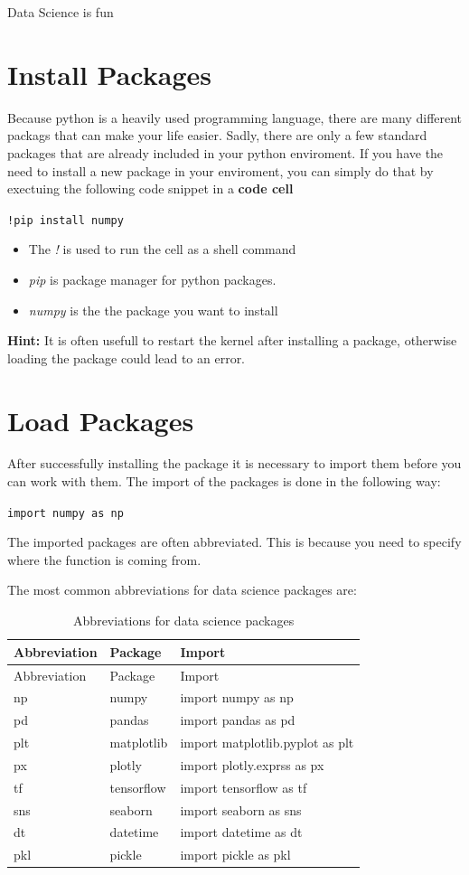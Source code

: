 \documentclass[
  letterpaper,
  DIV=11,
  numbers=noendperiod]{scrreprt}
\begin{document}
Data Science is fun

\section{Install Packages}\label{install-packages}

Because python is a heavily used programming language, there are many
different packags that can make your life easier. Sadly, there are only
a few standard packages that are already included in your python
enviroment. If you have the need to install a new package in your
enviroment, you can simply do that by exectuing the following code
snippet in a \textbf{code cell}

\texttt{!pip\ install\ numpy}

\begin{itemize}
\item
  The \emph{!} is used to run the cell as a shell command
\item
  \emph{pip} is package manager for python packages.
\item
  \emph{numpy} is the the package you want to install
\end{itemize}

\textbf{Hint:} It is often usefull to restart the kernel after
installing a package, otherwise loading the package could lead to an
error.

\section{Load Packages}\label{load-packages}

After successfully installing the package it is necessary to import them
before you can work with them. The import of the packages is done in the
following way:

\texttt{import\ numpy\ as\ np}

The imported packages are often abbreviated. This is because you need to
specify where the function is coming from.

The most common abbreviations for data science packages are:

\begin{longtable}[]{@{}lll@{}}
\caption{Abbreviations for data science packages}\tabularnewline
\toprule\noalign{}
Abbreviation & Package & Import \\
\midrule\noalign{}
\endfirsthead
\toprule\noalign{}
Abbreviation & Package & Import \\
\midrule\noalign{}
\endhead
\bottomrule\noalign{}
\endlastfoot
np & numpy & import numpy as np \\
pd & pandas & import pandas as pd \\
plt & matplotlib & import matplotlib.pyplot as plt \\
px & plotly & import plotly.exprss as px \\
tf & tensorflow & import tensorflow as tf \\
sns & seaborn & import seaborn as sns \\
dt & datetime & import datetime as dt \\
pkl & pickle & import pickle as pkl \\
\end{longtable}
\end{document}
